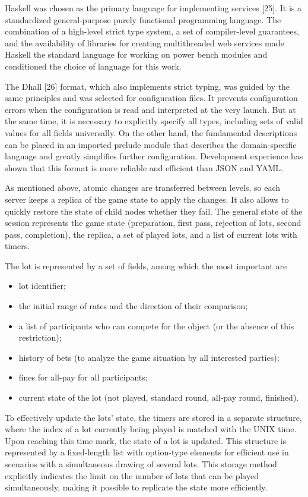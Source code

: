 \documentclass[
]{ceurart}
\begin{document}
Haskell was chosen as the primary language for implementing services [25]. It is a standardized general-purpose purely functional programming language. The combination of a high-level strict type system, a set of compiler-level guarantees, and the availability of libraries for creating multithreaded web services made Haskell the standard language for working on power bench modules and conditioned the choice of language for this work.

The Dhall [26] format, which also implements strict typing, was guided by the same principles and was selected for configuration files. It prevents configuration errors when the configuration is read and interpreted at the very launch. But at the same time, it is necessary to explicitly specify all types, including sets of valid values ​​for all fields universally. On the other hand, the fundamental descriptions can be placed in an imported prelude module that describes the domain-specific language and greatly simplifies further configuration. Development experience has shown that this format is more reliable and efficient than JSON and YAML.

As mentioned above, atomic changes are transferred between levels, so each server keeps a replica of the game state to apply the changes. It also allows to quickly restore the state of child nodes whether they fail. The general state of the session represents the game state (preparation, first pass, rejection of lots, second pass, completion), the replica, a set of played lots, and a list of current lots with timers.

The lot is represented by a set of fields, among which the most important are
\begin{itemize}
\item  lot identifier;
\item  the initial range of rates and the direction of their comparison;
\item  a list of participants who can compete for the object (or the absence of this restriction);
\item  history of bets (to analyze the game situation by all interested parties);
\item  fines for all-pay for all participants;
\item  current state of the lot (not played, standard round, all-pay round, finished).
\end{itemize}

To effectively update the lots' state, the timers are stored in a separate structure, where the index of a lot currently being played is matched with the UNIX time. Upon reaching this time mark, the state of a lot is updated. This structure is represented by a fixed-length list with option-type elements for efficient use in scenarios with a simultaneous drawing of several lots. This storage method explicitly indicates the limit on the number of lots that can be played simultaneously, making it possible to replicate the state more efficiently.
\end{document}
